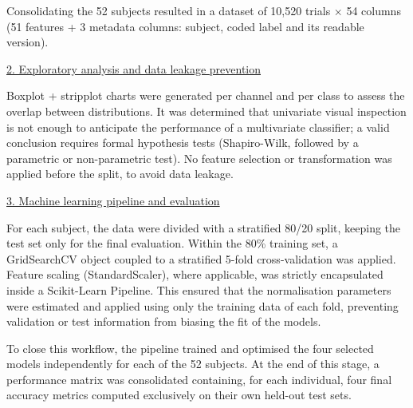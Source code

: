 \documentclass[12pt,a4paper]{article}
\newcommand{\subheading}[1]{%
  \par\noindent\underline{#1}\par\nopagebreak}
\begin{document}
Consolidating the 52 subjects resulted in a dataset of 10,520 trials $\times$ 54 columns
(51 features + 3 metadata columns: subject, coded label and its readable version).

\subheading{2. Exploratory analysis and data leakage prevention}
Boxplot + stripplot charts were generated per channel and per class to assess the overlap
between distributions. It was determined that univariate visual inspection is not enough to
anticipate the performance of a multivariate classifier; a valid conclusion requires formal
hypothesis tests (Shapiro-Wilk, followed by a parametric or non-parametric test). No feature
selection or transformation was applied before the split, to avoid data leakage.

\subheading{3. Machine learning pipeline and evaluation}
For each subject, the data were divided with a stratified 80/20 split, keeping the test set
only for the final evaluation. Within the 80\% training set, a GridSearchCV object coupled to a
stratified 5-fold cross-validation was applied. Feature scaling (StandardScaler), where
applicable, was strictly encapsulated inside a Scikit-Learn Pipeline. This ensured that the
normalisation parameters were estimated and applied using only the training data of each fold,
preventing validation or test information from biasing the fit of the models.

To close this workflow, the pipeline trained and optimised the four selected models
independently for each of the 52 subjects. At the end of this stage, a performance matrix was
consolidated containing, for each individual, four final accuracy metrics computed exclusively
on their own held-out test sets.
\end{document}
